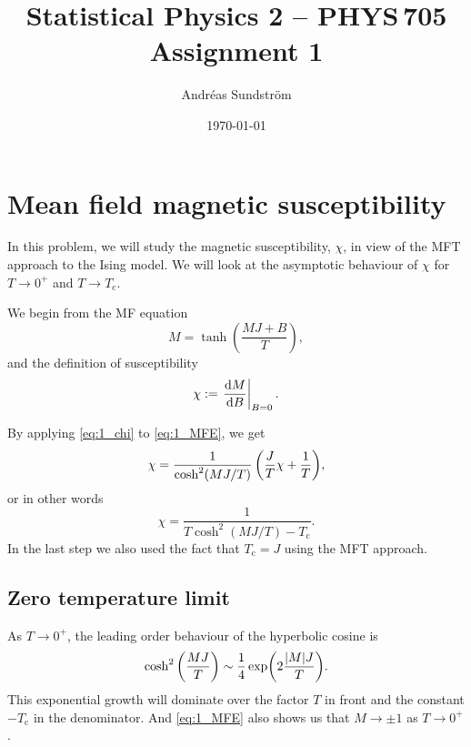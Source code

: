 \documentclass[11pt,letter, swedish, english
]{article}
\newcommand{\Tc}{\ensuremath{T_{\text{c}}}}
\begin{document}




\title{Statistical Physics 2 -- PHYS\,705 \\
Assignment 1}
\author{Andréas Sundström}
\date{\today}

\maketitle


\section{Mean field magnetic susceptibility}
\renewcommand{\thesubsection}{\arabic{section} (\roman{subsection})}

In this problem, we will study the magnetic susceptibility, $\chi$, in
view of the MFT approach to the Ising model. We will look at the
asymptotic behaviour of $\chi$ for $T\to0^+$ and $T\to\Tc$.

We begin from the MF equation
\begin{equation}\label{eq:1_MFE}
M=\tanh(\frac{MJ + B}{T}),
\end{equation}
and the definition of susceptibility
\begin{equation}\label{eq:1_chi}
\chi:=\eval{\dv{M}{B}}_{B=0}.
\end{equation}

By applying \eqref{eq:1_chi} to \eqref{eq:1_MFE}, we get
\begin{equation}
\chi=\frac{1}{\cosh^2(MJ/T)}\, 
\qty(\frac{J}{T}\chi+\frac{1}{T}),
\end{equation}
or in other words
\begin{equation}\label{eq:1_chi_exact}
\chi=\frac{1}{T\cosh^2(MJ/T)-\Tc}.
\end{equation}
In the last step we also used the fact that $\Tc=J$ using the MFT approach.

\subsection{Zero temperature limit}
As $T\to0^+$, the leading order behaviour of the hyperbolic cosine is
\begin{equation}
\cosh^2\qty(\frac{MJ}{T})\sim \frac{1}{4}\exp(2\frac{\abs{M}J}{T}).
\end{equation}
This exponential growth will dominate over the factor $T$ in
front and the constant $-\Tc$ in the denominator. And \eqref{eq:1_MFE}
also shows us that $M\to\pm1$ as $T\to0^+$. 
\end{document}
